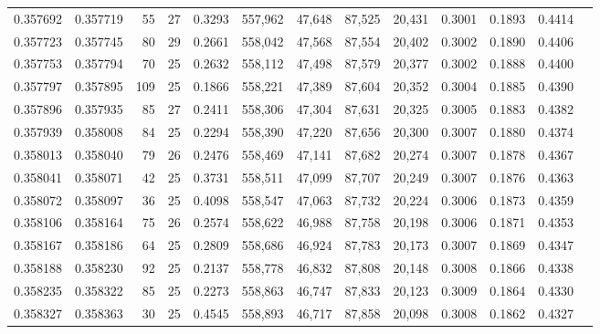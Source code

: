 \begin{tabular}{rrrrrrrrrrrrr}
0.357692 & 0.357719 &    55 &  27 &                                     0.3293 & 557,962 &  47,648 &  87,525 &  20,431 & 0.3001 & 0.1893 & 0.4414 \\
0.357723 & 0.357745 &    80 &  29 &                                     0.2661 & 558,042 &  47,568 &  87,554 &  20,402 & 0.3002 & 0.1890 & 0.4406 \\
0.357753 & 0.357794 &    70 &  25 &                                     0.2632 & 558,112 &  47,498 &  87,579 &  20,377 & 0.3002 & 0.1888 & 0.4400 \\
0.357797 & 0.357895 &   109 &  25 &                                     0.1866 & 558,221 &  47,389 &  87,604 &  20,352 & 0.3004 & 0.1885 & 0.4390 \\
0.357896 & 0.357935 &    85 &  27 &                                     0.2411 & 558,306 &  47,304 &  87,631 &  20,325 & 0.3005 & 0.1883 & 0.4382 \\
0.357939 & 0.358008 &    84 &  25 &                                     0.2294 & 558,390 &  47,220 &  87,656 &  20,300 & 0.3007 & 0.1880 & 0.4374 \\
0.358013 & 0.358040 &    79 &  26 &                                     0.2476 & 558,469 &  47,141 &  87,682 &  20,274 & 0.3007 & 0.1878 & 0.4367 \\
0.358041 & 0.358071 &    42 &  25 &                                     0.3731 & 558,511 &  47,099 &  87,707 &  20,249 & 0.3007 & 0.1876 & 0.4363 \\
0.358072 & 0.358097 &    36 &  25 &                                     0.4098 & 558,547 &  47,063 &  87,732 &  20,224 & 0.3006 & 0.1873 & 0.4359 \\
0.358106 & 0.358164 &    75 &  26 &                                     0.2574 & 558,622 &  46,988 &  87,758 &  20,198 & 0.3006 & 0.1871 & 0.4353 \\
0.358167 & 0.358186 &    64 &  25 &                                     0.2809 & 558,686 &  46,924 &  87,783 &  20,173 & 0.3007 & 0.1869 & 0.4347 \\
0.358188 & 0.358230 &    92 &  25 &                                     0.2137 & 558,778 &  46,832 &  87,808 &  20,148 & 0.3008 & 0.1866 & 0.4338 \\
0.358235 & 0.358322 &    85 &  25 &                                     0.2273 & 558,863 &  46,747 &  87,833 &  20,123 & 0.3009 & 0.1864 & 0.4330 \\
0.358327 & 0.358363 &    30 &  25 &                                     0.4545 & 558,893 &  46,717 &  87,858 &  20,098 & 0.3008 & 0.1862 & 0.4327 \\

\end{tabular}
